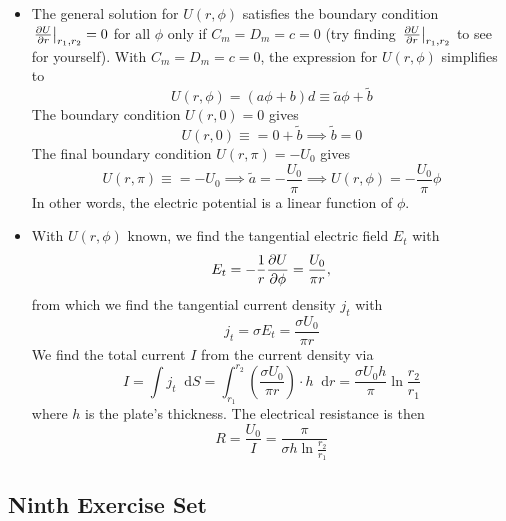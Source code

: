 \documentclass[11pt, a4paper]{article}
\newcommand{\diff}{\mathop{}\!\mathrm{d}} %
\renewcommand{\t}[1]{\tilde{#1}} %
\begin{document}
\begin{itemize}
	\item The general solution for $ U(r, \phi) $ satisfies the boundary condition $ \eval{\pdv{U}{r}}_{r_{1}, r_{2}} = 0 $ for all $ \phi $ only if $ C_{m} = D_{m} = c = 0 $ (try finding $ \eval{\pdv{U}{r}}_{r_{1}, r_{2}}  $ to see for yourself). With $  C_{m} = D_{m} = c = 0 $, the expression for $ U(r, \phi) $ simplifies to
	\begin{equation*}
		U(r, \phi) = (a \phi + b)d \equiv \t{a}\phi + \t{b}
	\end{equation*}
	The boundary condition $ U(r, 0) = 0 $ gives
	\begin{equation*}
		U(r, 0) \equiv = 0 + \t{b} \implies \t{b} = 0
	\end{equation*}
	The final boundary condition $ U(r, \pi) = -U_{0} $ gives
	\begin{equation*}
		U(r, \pi) \equiv = - U_{0} \implies \t{a} = -\frac{U_{0}}{\pi} \implies U(r, \phi) = - \frac{U_{0}}{\pi} \phi
	\end{equation*}
	In other words, the electric potential is a linear function of $ \phi $. 
	
	\item With $ U(r, \phi) $ known, we find the tangential electric field $ E_{t} $ with
	\begin{equation*}
		E_{t} = - \frac{1}{r}\pdv{U}{\phi} = \frac{U_{0}}{\pi r},
	\end{equation*}
	from which we find the tangential current density $ j_{t} $ with
	\begin{equation*}
		j_{t} = \sigma E_{t} = \frac{\sigma U_{0}}{\pi r}
	\end{equation*}
	We find the total current $ I $ from the current density via
	\begin{equation*}
		I = \int j_{t} \diff S = \int_{r_{1}}^{r_{2}} \left(\frac{\sigma U_{0}}{\pi r}\right) \cdot h \diff r = \frac{\sigma U_{0} h}{\pi} \ln \frac{r_{2}}{r_{1}}
	\end{equation*}
	where $ h $ is the plate's thickness. The electrical resistance is then
	\begin{equation*}
		R = \frac{U_{0}}{I} = \frac{\pi}{\sigma h \ln \frac{r_{2}}{r_{1}}}
	\end{equation*}
\end{itemize}

\subsection{Ninth Exercise Set}
\end{document}
